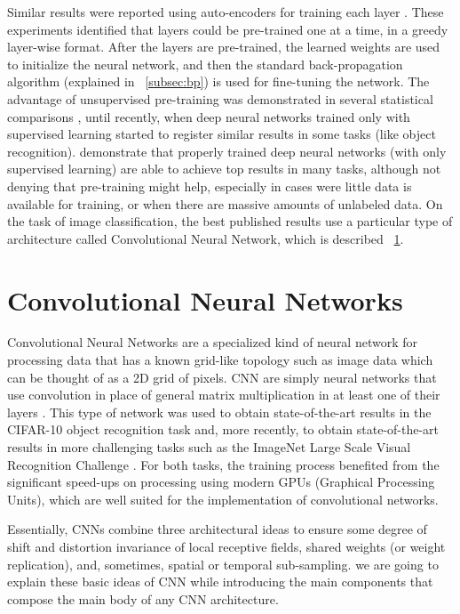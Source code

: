 \indent Similar results were reported using auto-encoders for training each layer \cite{bengio2007greedy}. These experiments identified that layers could be pre-trained one at a time, in a greedy layer-wise format. After the layers are pre-trained, the learned weights are used to initialize the neural network, and then the standard back-propagation algorithm (explained in ~\ref{subsec:bp}) is used for fine-tuning the network. The advantage of unsupervised pre-training was demonstrated in several statistical comparisons \cite{bengio2007greedy,larochelle2007empirical,erhan2009difficulty}, until recently, when deep neural networks trained only with supervised learning started to register similar results in some tasks (like object recognition). \citealt{ciresan2012multi} demonstrate that properly trained deep neural networks (with only supervised learning) are able to achieve top results in many tasks, although not denying that pre-training might help, especially in cases were little data is available for training, or when there are massive amounts of unlabeled data. On the task of image classification, the best published results use a particular type of architecture called Convolutional Neural Network, which is described ~\ref{sec:cnn}.



\section{Convolutional Neural Networks}
\label{sec:cnn}
Convolutional Neural Networks are a specialized kind of neural network for processing data that has a known grid-like topology such as image data which can be thought of as a 2D grid of pixels. CNN are simply neural networks that use convolution in place of general matrix multiplication in at least one of their layers \cite{Goodfellow-et-al-2016-Book}. This type of network was used to obtain state-of-the-art results in the CIFAR-10 object recognition task \cite{ciresan2012multi} and, more recently, to obtain state-of-the-art results in more challenging tasks such as the ImageNet Large Scale Visual Recognition Challenge \cite{russakovsky2015imagenet}. For both tasks, the training process benefited from the significant speed-ups on processing using modern GPUs (Graphical Processing Units), which are well suited for the implementation of convolutional networks.


Essentially, CNNs combine three architectural ideas to ensure some degree of shift and distortion invariance of local receptive fields, shared weights (or weight replication), and, sometimes, spatial or temporal sub-sampling\cite{lecun2010convolutional}. we are going to explain these basic ideas of CNN while introducing the main components that compose the main body of any CNN architecture.

